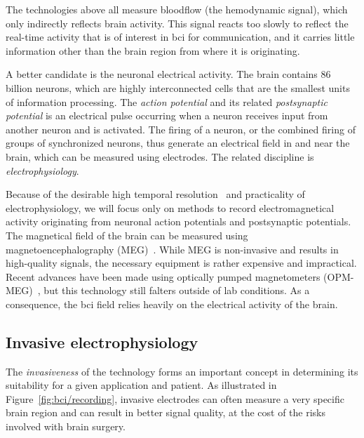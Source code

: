 The technologies above all measure bloodflow (the hemodynamic signal), which only indirectly
reflects brain activity.
This signal reacts too slowly to reflect the real-time activity that is
of interest in \ac{bci} for communication, and it carries little information
other than the brain region from where it is originating.

A better candidate is the neuronal electrical activity.
The brain contains 86 billion neurons, which are highly interconnected cells that are
the smallest units of information processing.
The \emph{action potential} and its related \emph{postsynaptic potential}
is an electrical pulse occurring when a neuron receives
input from another neuron and is activated.
The firing of a neuron, or the combined firing of groups of
synchronized neurons, thus generate an electrical field in and near the brain,
which can be measured using electrodes.
The related discipline is \emph{electrophysiology}.

Because of the desirable high temporal resolution~\cite{Easttom2021} and
practicality of electrophysiology, we will focus only on methods to record
electromagnetical activity originating from neuronal action potentials and
postsynaptic potentials.
The magnetical field of the brain can be measured using magnetoencephalography
(MEG)~\cite{Mellinger2007}.
While MEG is non-invasive and results in high-quality signals, the necessary
equipment is rather expensive and impractical.
Recent advances have been made using optically pumped magnetometers
(OPM-MEG)~\cite{Wittevrongel2021}, but this technology still falters outside of
lab conditions.
As a consequence, the \ac{bci} field relies heavily on the
electrical activity of the brain.


\subsection{Invasive electrophysiology}
The \emph{invasiveness} of the technology forms an
important concept in determining its suitability for a given application and
patient.
As illustrated in Figure~\ref{fig:bci/recording}, invasive electrodes can often
measure a very specific brain region and can result in better signal quality, at the cost of the risks
involved with brain surgery.


